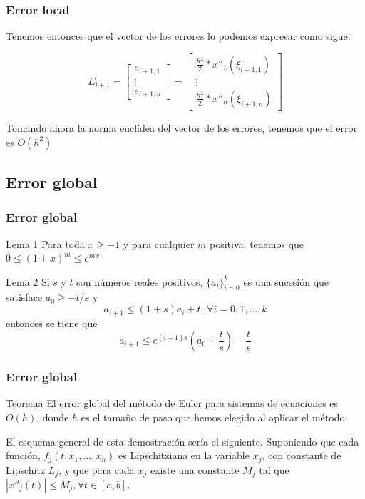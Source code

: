 \documentclass{beamer}
\begin{document}
\begin{frame}
	\frametitle{Error local}
	
	Tenemos entonces que el vector de los errores lo podemos expresar como sigue:
	
	\begin{equation*}
	E_{i+1}=\begin{bmatrix}
	e_{i+1, 1} \\
	\vdots \\
	e_{i+1, n}
	\end{bmatrix}=\begin{bmatrix}
	\frac{h^2}{2}*x''_1(\xi_{i+1, 1}) \\
	\vdots \\
	\frac{h^2}{2}*x''_n(\xi_{i+1, n})
	\end{bmatrix}
	\end{equation*}
	
	Tomando ahora la norma euclídea del vector de los errores, tenemos que el error es $O(h^2)$
\end{frame}

\subsection{Error global}
\begin{frame}
	\frametitle{Error global}
	
	\begin{block}{Lema 1}
		Para toda $x \geq -1$ y para cualquier $m$ positiva, tenemos que $0 \leq (1 + x)^m \leq e^{mx}$
	\end{block}
	
	
	\begin{block}{Lema 2}
		Si $s$ y $t$ son números reales positivos, $\{a_i\}^k_{i=0}$ es una sucesión que satisface $ a_0 \geq -t/s$ y
		$$a_{i+1} \leq (1+s)a_i + t, \, \forall i=0, 1, ..., k$$
		entonces se tiene que
		$$a_{i+1} \leq e^{(i+1)s}\left( a_0 + \frac{t}{s}\right) - \frac{t}{s}$$
	\end{block}
	
	
	
\end{frame}

\begin{frame}
	\frametitle{Error global}
	\begin{block}{Teorema}
		El error global del método de Euler para sistemas de ecuaciones es $O(h)$, donde $h$ es el tamaño de paso que hemos elegido al aplicar el método. 
	\end{block}
	
	El esquema general de esta demostración sería el siguiente. Suponiendo que cada función, $f_j(t, x_1, ..., x_n)$ es Lipschitziana en la variable $x_j$, con constante de Lipschitz $L_j$, y que para cada $x_j$ existe una constante $M_j$ tal que $| x''_j(t) | \leq M_j, \forall t \in [a,b]$.\\
	
	
\end{frame}
\end{document}
